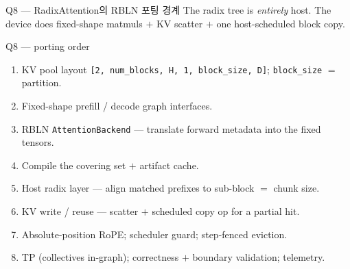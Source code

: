 \begin{frame}{Q8 — RadixAttention의 RBLN 포팅 경계}
  \footnotesize The radix tree is \emph{entirely} host. The device does fixed-shape matmuls
  $+$ KV scatter $+$ one host-scheduled block copy.
  \vspace{0.4em}
  \begin{center}\resizebox{0.98\textwidth}{!}{}\end{center}
\end{frame}

\begin{frame}{Q8 — porting order}
  \begin{enumerate}\setlength\itemsep{3pt}
    \item KV pool layout \texttt{[2, num\_blocks, H, 1, block\_size, D]}; \texttt{block\_size} $=$ partition.
    \item Fixed-shape prefill / decode graph interfaces.
    \item RBLN \texttt{AttentionBackend} — translate forward metadata into the fixed tensors.
    \item Compile the covering set $+$ artifact cache.
    \item Host radix layer — align matched prefixes to sub-block $=$ chunk size.
    \item KV write / reuse — scatter $+$ scheduled copy op for a partial hit.
    \item Absolute-position RoPE; scheduler guard; step-fenced eviction.
    \item TP (collectives in-graph); correctness $+$ boundary validation; telemetry.
  \end{enumerate}
\end{frame}

